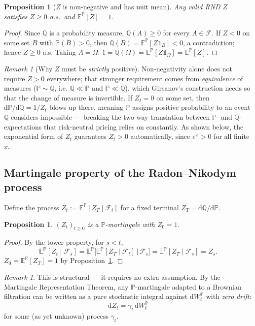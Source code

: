 \documentclass[11pt]{article}
\newtheorem{proposition}[theorem]{Proposition}
\theoremstyle{definition}
\theoremstyle{remark}
\newtheorem{remark}[theorem]{Remark}
\newcommand{\dd}{\mathrm{d}}
\newcommand{\E}{\mathbb{E}}
\renewcommand{\P}{\mathbb{P}}
\newcommand{\Q}{\mathbb{Q}}
\newcommand{\F}{\mathcal{F}}
\begin{document}
\begin{proposition}[$Z$ is non-negative and has unit mean]
\label{prop:Znonneg}
Any valid RND $Z$ satisfies $Z \ge 0$ a.s.\ and $\E^\P[Z] = 1$.
\end{proposition}

\begin{proof}
Since $\Q$ is a probability measure, $\Q(A) \ge 0$ for every $A \in \F$. If $Z<0$ on some set
$B$ with $\P(B)>0$, then $\Q(B) = \E^\P[Z\mathds{1}_B] < 0$, a contradiction; hence $Z \ge 0$ a.s.
Taking $A = \Omega$: $1 = \Q(\Omega) = \E^\P[Z\mathds{1}_\Omega] = \E^\P[Z]$.
\end{proof}

\begin{remark}[Why $Z$ must be \emph{strictly} positive]
Non-negativity alone does not require $Z>0$ everywhere; that stronger requirement comes from
\emph{equivalence} of measures ($\P \sim \Q$, i.e. $\Q \ll \P$ and $\P \ll \Q$), which Girsanov's
construction needs so that the change of measure is invertible. If $Z_t = 0$ on some set, then
$\dd\P/\dd\Q = 1/Z_t$ blows up there, meaning $\P$ assigns positive probability to an event $\Q$
considers impossible — breaking the two-way translation between $\P$- and $\Q$-expectations that
risk-neutral pricing relies on constantly. As shown below, the exponential form of $Z_t$ guarantees
$Z_t>0$ automatically, since $e^x>0$ for all finite $x$.
\end{remark}

\subsection{Martingale property of the Radon--Nikodym process}

Define the process $Z_t := \E^\P[Z_T \mid \F_t]$ for a fixed terminal $Z_T = \dd\Q/\dd\P$.

\begin{proposition}
\label{prop:Zmart}
$(Z_t)_{t\ge0}$ is a $\P$-martingale with $Z_0=1$.
\end{proposition}
\begin{proof}
By the tower property, for $s<t$,
\[
\E^\P[Z_t \mid \F_s] = \E^\P\big[\E^\P[Z_T\mid\F_t] \,\big|\, \F_s\big] = \E^\P[Z_T\mid\F_s] = Z_s.
\]
$Z_0 = \E^\P[Z_T] = 1$ by Proposition~\ref{prop:Znonneg}.
\end{proof}

\begin{remark}
This is structural — it requires no extra assumption. By the Martingale Representation Theorem, any
$\P$-martingale adapted to a Brownian filtration can be written as a pure stochastic integral
against $\dd W_t^\P$ with \emph{zero drift}:
\[
\dd Z_t = \gamma_t\,\dd W_t^\P
\]
for some (as yet unknown) process $\gamma_t$.
\end{remark}
\end{document}
